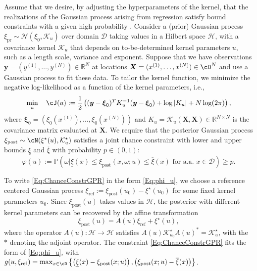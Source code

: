 \documentclass[%
onefignum,onetabnum]{siamonline250211}
\newcommand{\bbR}{\mathbb R}
\newcommand{\cK}{\mathcal K} \newcommand{\cL}{\mathcal L}
\newcommand{\D}{{\mathcal D}}
\begin{document}
\begin{example}\label{ex:GPR}
Assume that we desire, by adjusting the hyperparameters of the kernel, that the realizations of the Gaussian process arising from regression satisfy bound constraints with a given high probability \cite{SwGuFrSaJa-JMLMC20, PeYaZh-TAML20}. Consider a (prior) Gaussian process $\xi_\text{pr}\sim \mathcal N(\xi_0,\mathcal K_u)$ over domain $\D$ taking values in a Hilbert space $\mathscr{H}$, with a covariance kernel $\mathcal K_u$ that depends on to-be-determined kernel parameters $u$, such as a length scale, variance and exponent. Suppose that we have observations $\boldsymbol{y}=(y^{(1)},\dots,y^{(N)})\in\bbR^N$ at locations $\boldsymbol{X}=(x^{(1)},\dots,x^{(N)})\in\cD^N$ and use a Gaussian process to fit these data. To tailor the kernel function, we minimize the negative log-likelihood as a function of the kernel parameters, i.e.,
\begin{equation}\label{Eq:ObjFunc}
    \min_{u}\quad \cJ(u):=\frac{1}{2}\left( (\boldsymbol y-\boldsymbol \xi_0)^T K_u^{-1} (\boldsymbol y-\boldsymbol\xi_0) + \log |K_u| + N\log(2\pi) \right),
\end{equation}
where $\boldsymbol\xi_0=(\xi_0(x^{(1)}),\ldots,\xi_0(x^{(N)}))$ and $K_u=\cK_u(\boldsymbol{X},\boldsymbol{X})\in\bbR^{N\times N}$ is the covariance matrix evaluated at $\boldsymbol{X}$. We require that the posterior Gaussian process $\xi_\text{post}\sim\cN(\xi^\star(u),\cK^\star_u)$ satisfies a joint chance constraint with lower and upper bounds $\underline\xi$ and $\overline{\xi}$ with probability $p\in(0,1)$:
\begin{equation}\label{Eq:ChanceConstrGPR}
    \varphi(u):=\mathbb P(\omega|\underline\xi(x)\le \xi_{\text{post}}(x,\omega;u)\le \overline\xi(x) \text{ for a.a.~} x\in \D) \ge p.
\end{equation}

To write \eqref{Eq:ChanceConstrGPR} in the form \eqref{Eq:phi_u}, we choose a reference centered Gaussian process $\xi_{\mathrm{ref}}:=\xi_{\mathrm{post}}(u_0)-\xi^\star(u_0)$ for some fixed kernel parameters $u_0$. Since $\xi_{\mathrm{post}}(u)$ takes values in $\mathscr{H}$, the posterior with different kernel parameters can be recovered by the affine transformation 
\begin{equation}\label{Eq:GPtransform}
    \xi_{\text{post}}(u)=A(u)\xi_{\mathrm{ref}}+\xi^\star(u),
\end{equation}
where the operator $A(u):\mathscr{H}\to \mathscr{H}$ satisfies $A(u) \cK_{u_0}^\star A(u)^* = \cK_u^\star$,
with the $*$ denoting the adjoint operator.
The constraint \eqref{Eq:ChanceConstrGPR} fits the form of \eqref{Eq:phi_u}, with
$g(u,\xi_{\mathrm{ref}})=\max_{x\in\cD}{\left\{ \left( \underline{\xi}(x)-\xi_{\text{post}}(x;u) \right), \left( \xi_{\text{post}}(x;u)-\overline{\xi}(x) \right)\right\}}$.

\end{example}
\end{document}
